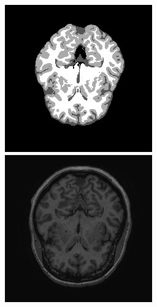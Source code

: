\documentclass[runningheads,a4paper]{llncs}
\begin{document}
\begin{figure}
  \vspace{0.3em}
   \begin{minipage}{.24\textwidth}
 \includegraphics[width=.99\linewidth]{./images/sl19-v10-test-challres_new.png}
 \end{minipage}
  \begin{minipage}{.24\textwidth}
 \includegraphics[width=.99\linewidth]{./images/sl19-v10-test-t1.png}

\end{minipage}
\end{figure}
\end{document}
